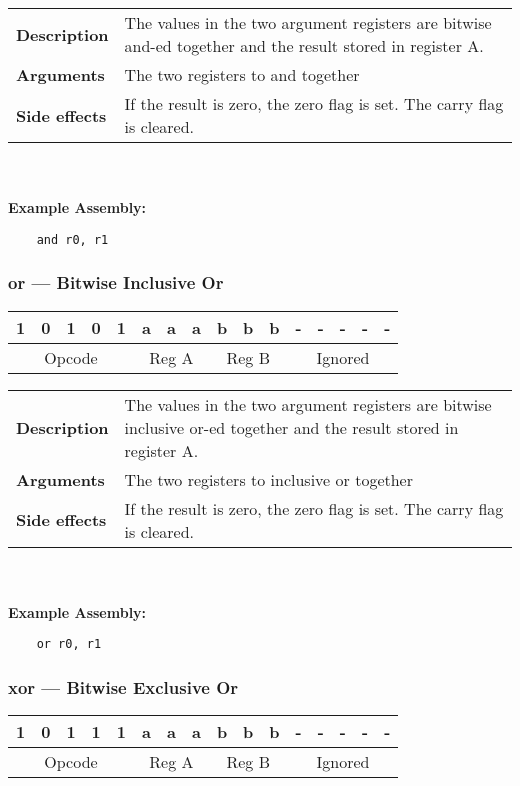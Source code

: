 \documentclass[titlepage]{article}
\begin{document}
\begin{tabular}{l p{8cm}}
{\bf Description} & The values in the two argument registers are bitwise and-ed together and the result stored in register A. \\
{\bf Arguments} & The two registers to and together \\
{\bf Side effects} & If the result is zero, the zero flag is set. The carry flag is cleared. \\
\end{tabular}\\ \\
{\bf Example Assembly:}
\begin{verbatim}
    and r0, r1
\end{verbatim}

\subsubsection{or --- Bitwise Inclusive Or}\begin{center}
\begin{tabular}{|c|c|c|c|c|c|c|c|c|c|c|c|c|c|c|c|}
\hline
1 & 0 & 1 & 0 & 1 & a & a & a & b & b & b & - & - & - & - & - \\
\hline
\multicolumn{5}{|c}{Opcode} &
\multicolumn{3}{|c}{Reg A} &
\multicolumn{3}{|c}{Reg B} &
\multicolumn{5}{|c|}{Ignored} \\
\hline
\end{tabular}
\end{center}

\begin{tabular}{l p{8cm}}
{\bf Description} & The values in the two argument registers are bitwise inclusive or-ed together and the result stored in register A. \\
{\bf Arguments} & The two registers to inclusive or together \\
{\bf Side effects} & If the result is zero, the zero flag is set. The carry flag is cleared. \\
\end{tabular}\\ \\
{\bf Example Assembly:}
\begin{verbatim}
    or r0, r1
\end{verbatim}

\subsubsection{xor --- Bitwise Exclusive Or}\begin{center}
\begin{tabular}{|c|c|c|c|c|c|c|c|c|c|c|c|c|c|c|c|}
\hline
1 & 0 & 1 & 1 & 1 & a & a & a & b & b & b & - & - & - & - & - \\
\hline
\multicolumn{5}{|c}{Opcode} &
\multicolumn{3}{|c}{Reg A} &
\multicolumn{3}{|c}{Reg B} &
\multicolumn{5}{|c|}{Ignored} \\
\hline
\end{tabular}
\end{center}
\end{document}

